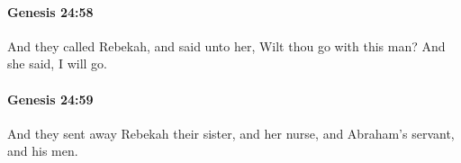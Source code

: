 		\paragraph{Genesis 24:58} %
			\label{GENESIS-24-58}

			And they called Rebekah, and said unto her, Wilt thou go with this man? And she said, I will go.


		\paragraph{Genesis 24:59} %
			\label{GENESIS-24-59}

			And they sent away Rebekah their sister, and her nurse, and Abraham's servant, and his men.


